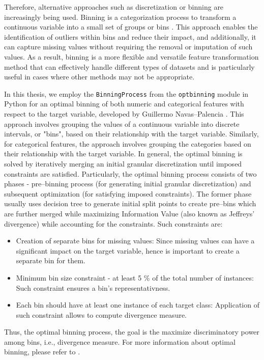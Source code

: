 Therefore, alternative approaches such as discretization or binning are increasingly being used. Binning is a categorization process to transform a continuous variable into a small set of groups or bins \citep{zeng2014necessary}. This approach enables the identification of outliers within bins and reduce their impact, and additionally, it can capture missing values without requiring the removal or imputation of such values.
As a result, binning is a more flexible and versatile feature transformation method that can effectively handle different types of datasets and is particularly useful in cases where other methods may not be appropriate.

In this thesis, we employ the \lstinline{BinningProcess} from the \lstinline{optbinning} module in Python for an optimal binning of both numeric and categorical features with respect to the target variable, developed by Guillermo Navas--Palencia \citep{navas2020optimal}. 
This approach involves grouping the values of a continuous variable into discrete intervals, or "bins", based on their relationship with the target variable.
Similarly, for categorical features, the approach involves grouping the categories based on their relationship with the target variable.
In general, the optimal binning is solved by iteratively merging an initial granular discretization until imposed constraints are satisfied. Particularly, the optimal binning process consists of two phases - pre--binning process (for generating initial granular discretization) and subsequent optimization (for satisfying imposed constraints).
The former phase usually uses decision tree to generate initial split points to create pre--bins which are further merged while maximizing Information Value (also known as Jeffreys' divergence) while accounting for the constraints. \citep{navas2020optimal} Such constraints are:
\begin{itemize}\setlength\itemsep{0em} 
    \item Creation of separate bins for missing values: Since missing values can have a significant impact on the target variable, hence is important to create a separate bin for them.
    \item Minimum bin size constraint - at least 5 \% of the total number of instances: Such constraint ensures a bin's representativness.
    \item Each bin should have at least one instance of each target class: Application of such constraint allows to compute divergence measure.
\end{itemize}
Thus, the optimal binning process, the goal is the maximize discriminatory power among bins, i.e., divergence measure.
For more information about optimal binning, please refer to \citep{navas2020optimal}.


